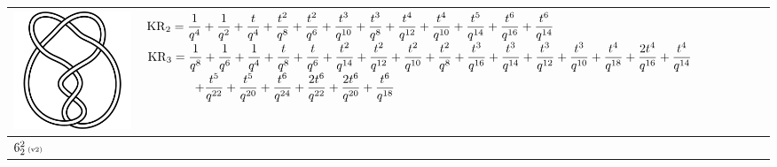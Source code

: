 \documentclass{compositio}
\theoremstyle{definition}
\numberwithin{equation}{section}
\begin{document}
{\begin{longtable}{p{}|p{}}
\includegraphics[scale=0.07,angle=0]{link6_2_2.pdf} 
& 
$
\displaystyle{%
\KR_{2} = \frac{1}{q^4}+\frac{1}{q^2}+\frac{t}{q^4}+\frac{t^2}{q^8}+\frac{t^2}{q^6}+\frac{t^3}{q^{10}}+\frac{t^3}{q^8}+\frac{t^4}{q^{12}}+\frac{t^4}{q^{10}}+\frac{t^5}{q^{14}}+\frac{t^6}{q^{16}}+\frac{t^6}{q^{14}}
}
$
\newline 
$
\displaystyle{%
\KR_{3} = \frac{1}{q^8}+\frac{1}{q^6}+\frac{1}{q^4}+\frac{t}{q^8}+\frac{t}{q^6}+\frac{t^2}{q^{14}}+\frac{t^2}{q^{12}}+\frac{t^2}{q^{10}}+\frac{t^2}{q^8}+\frac{t^3}{q^{16}}+\frac{t^3}{q^{14}}+\frac{t^3}{q^{12}}+\frac{t^3}{q^{10}}+\frac{t^4}{q^{18}}+\frac{2 t^4}{q^{16}}+\frac{t^4}{q^{14}}
}
$
\newline
$
\displaystyle{%
\qquad\qquad +\frac{t^5}{q^{22}}+\frac{t^5}{q^{20}}+\frac{t^6}{q^{24}}+\frac{2 t^6}{q^{22}}+\frac{2 t^6}{q^{20}}+\frac{t^6}{q^{18}}
}
$
\\
\hline
$6_{2}^2\,\text{{\tiny (v2)}}$ 

\end{longtable}}
\end{document}
